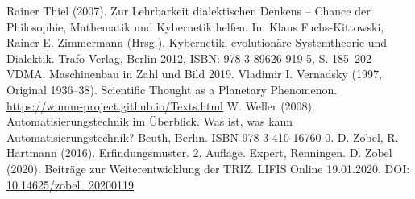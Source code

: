 \documentclass[11pt,a4paper]{article}
\begin{document}
\begin{thebibliography}{xxx}
 Rainer Thiel (2007). Zur Lehrbarkeit dialektischen Denkens
  – Chance der Philosophie, Mathematik und Kybernetik helfen. In: Klaus
  Fuchs-Kittowski, Rainer E. Zimmermann (Hrsg.). Kybernetik, evolutionäre
  Systemtheorie und Dialektik. Trafo Verlag, Berlin 2012, ISBN:
  978-3-89626-919-5, S. 185--202
 VDMA. Maschinenbau in Zahl und Bild 2019. 
 Vladimir I. Vernadsky (1997, Original 1936--38).
  Scientific Thought as a Planetary Phenomenon.
  \url{https://wumm-project.github.io/Texts.html}
 W. Weller (2008). Automatisierungstechnik im
  Überblick. Was ist, was kann Automatisierungstechnik? Beuth, Berlin. ISBN
  978-3-410-16760-0.
 D. Zobel, R. Hartmann (2016). Erfindungsmuster.
  2. Auflage.  Expert, Renningen.
 D. Zobel (2020). Beiträge zur Weiterentwicklung der TRIZ.
  LIFIS Online 19.01.2020. DOI: \url{10.14625/zobel_20200119}
\end{thebibliography}
\end{document}
